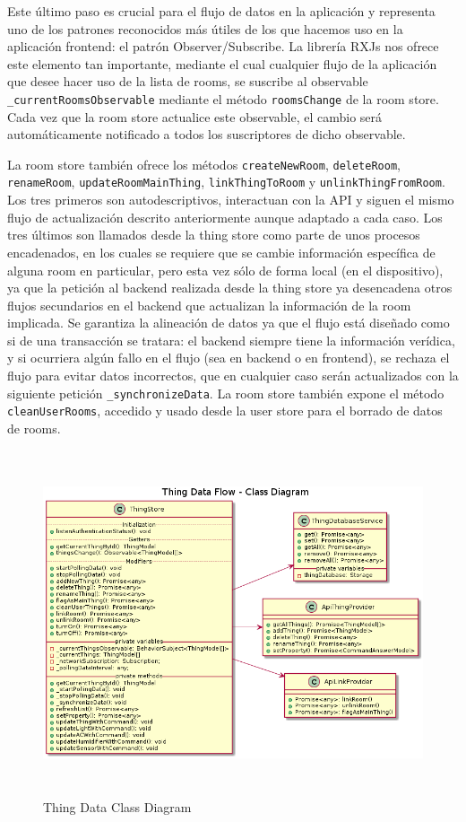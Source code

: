 \vspace{0.5cm}

Este último paso es crucial para el flujo de datos en la aplicación y representa uno de los patrones reconocidos más útiles de los que hacemos uso en la aplicación frontend: el patrón Observer/Subscribe. La librería RXJs nos ofrece este elemento tan importante, mediante el cual cualquier flujo de la aplicación que desee hacer uso de la lista de rooms, se suscribe al observable \verb|_currentRoomsObservable| mediante el método \verb|roomsChange| de la room store. Cada vez que la room store actualice este observable, el cambio será automáticamente notificado a todos los suscriptores de dicho observable.

\vspace{0.5cm}

La room store también ofrece los métodos \verb|createNewRoom|, \verb|deleteRoom|, \verb|renameRoom|, \verb|updateRoomMainThing|, \verb|linkThingToRoom| y \verb|unlinkThingFromRoom|. Los tres primeros son autodescriptivos, interactuan con la API y siguen el mismo flujo de actualización descrito anteriormente aunque adaptado a cada caso. Los tres últimos son llamados desde la thing store como parte de unos procesos encadenados, en los cuales se requiere que se cambie información específica de alguna room en particular, pero esta vez sólo de forma local (en el dispositivo), ya que la petición al backend realizada desde la thing store ya desencadena otros flujos secundarios en el backend que actualizan la información de la room implicada. Se garantiza la alineación de datos ya que el flujo está diseñado como si de una transacción se tratara: el backend siempre tiene la información verídica, y si ocurriera algún fallo en el flujo (sea en backend o en frontend), se rechaza el flujo para evitar datos incorrectos, que en cualquier caso serán actualizados con la siguiente petición \verb|_synchronizeData|. 
La room store también expone el método \verb|cleanUserRooms|, accedido y usado desde la user store para el borrado de datos de rooms.

\begin{figure}[hbt!]
\centering
\includegraphics[height=4in]{figures/diagrams/front/data-flow/thing.png}
\caption[thing]{Thing Data Class Diagram\footnotemark}
\end{figure}

